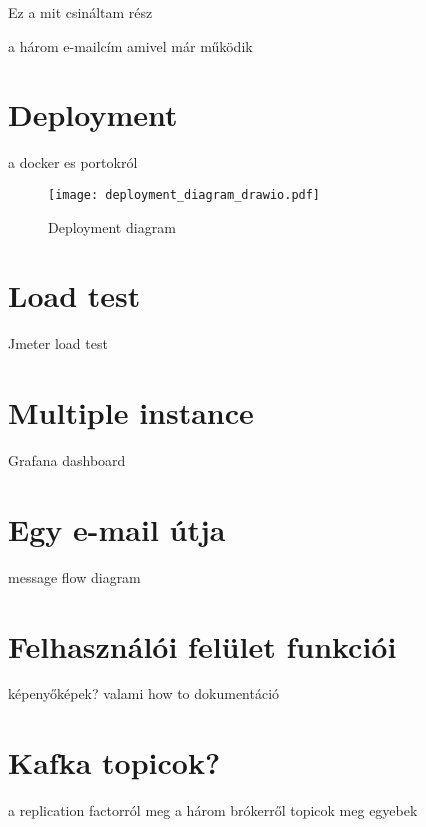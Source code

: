 Ez a mit csináltam rész

a három e-mailcím amivel már működik


\section{Deployment}
a docker es portokról 

\begin{figure}[hbt] 
	\centering
	\texttt{[image: deployment\_diagram\_drawio.pdf]}
	\caption[Deployment diagram]{Deployment diagram}
	\label{fig:deployment_diagram}
\end{figure}


\section{Load test}
Jmeter load test

\section{Multiple instance}
Grafana dashboard

\section{Egy e-mail útja}
message flow diagram

\section{Felhasználói felület funkciói}
 képenyőképek? valami how to dokumentáció	

\section{Kafka topicok?}
a replication factorról meg a három brókerről
topicok meg egyebek
